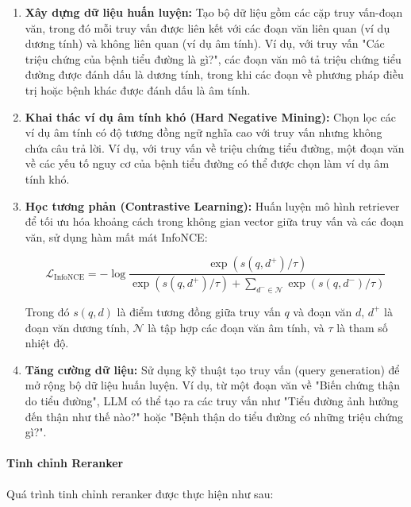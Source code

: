 \begin{enumerate}
    \item \textbf{Xây dựng dữ liệu huấn luyện:} Tạo bộ dữ liệu gồm các cặp truy vấn-đoạn văn, trong đó mỗi truy vấn được liên kết với các đoạn văn liên quan (ví dụ dương tính) và không liên quan (ví dụ âm tính). Ví dụ, với truy vấn "Các triệu chứng của bệnh tiểu đường là gì?", các đoạn văn mô tả triệu chứng tiểu đường được đánh dấu là dương tính, trong khi các đoạn về phương pháp điều trị hoặc bệnh khác được đánh dấu là âm tính.
    
    \item \textbf{Khai thác ví dụ âm tính khó (Hard Negative Mining):} Chọn lọc các ví dụ âm tính có độ tương đồng ngữ nghĩa cao với truy vấn nhưng không chứa câu trả lời. Ví dụ, với truy vấn về triệu chứng tiểu đường, một đoạn văn về các yếu tố nguy cơ của bệnh tiểu đường có thể được chọn làm ví dụ âm tính khó.
    
    \item \textbf{Học tương phản (Contrastive Learning):} Huấn luyện mô hình retriever để tối ưu hóa khoảng cách trong không gian vector giữa truy vấn và các đoạn văn, sử dụng hàm mất mát InfoNCE:
    
    \begin{equation}
    \mathcal{L}_{\text{InfoNCE}} = -\log \frac{\exp(s(q, d^+)/\tau)}{\exp(s(q, d^+)/\tau) + \sum_{d^- \in \mathcal{N}} \exp(s(q, d^-)/\tau)}
    \end{equation}
    
    Trong đó $s(q, d)$ là điểm tương đồng giữa truy vấn $q$ và đoạn văn $d$, $d^+$ là đoạn văn dương tính, $\mathcal{N}$ là tập hợp các đoạn văn âm tính, và $\tau$ là tham số nhiệt độ.
    
    \item \textbf{Tăng cường dữ liệu:} Sử dụng kỹ thuật tạo truy vấn (query generation) để mở rộng bộ dữ liệu huấn luyện. Ví dụ, từ một đoạn văn về "Biến chứng thận do tiểu đường", LLM có thể tạo ra các truy vấn như "Tiểu đường ảnh hưởng đến thận như thế nào?" hoặc "Bệnh thận do tiểu đường có những triệu chứng gì?".
\end{enumerate}

\paragraph{Tinh chỉnh Reranker}
Quá trình tinh chỉnh reranker được thực hiện như sau:

